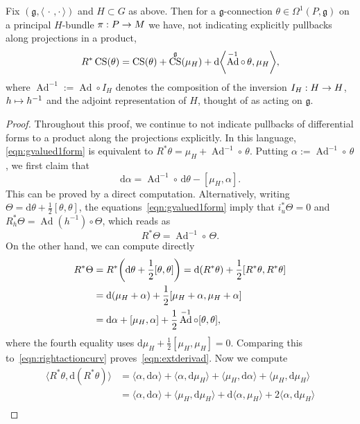 \documentclass[AHL,Unicode,longabstracts]{cedram}
\newcommand{\B}[2]{\langle#1,#2\rangle}
\DeclareMathOperator{\CS}{CS}
\DeclareMathOperator{\Ad}{Ad}
\renewcommand*{\d}{\mathrm{d}}
\newcommand{\fkg}{\mathfrak{g}}
\renewcommand*{\to}{\mathchoice{\longrightarrow}{\rightarrow}{\rightarrow}{\rightarrow}}
\let\oldmapsto\mapsto
\renewcommand*{\mapsto}{\mathchoice{\longmapsto}{\oldmapsto}{\oldmapsto}{\oldmapsto}}
\let\originalleft\left
\let\originalright\right
\renewcommand{\left}{\mathopen{}\mathclose\bgroup\originalleft}
\renewcommand{\right}{\aftergroup\egroup\originalright}
\begin{document}
\begin{lemm}\label{lemm3.4}
Fix $(\fkg,\B{\,\cdot\,}{\cdot\,})$ and $H\subset G$ as above.
Then for a $\fkg$-connection $\theta \in \Omega^1(P,\fkg)$ on a principal $H$-bundle $\pi : P \to M$ we have, not indicating explicitly pullbacks along projections in a product,
\begin{equation}\label{eqn:keyid}
R^*\CS(\theta)=\CS(\theta)+\CS^\fkg(\mu_H)+\d\left\langle\Ad^{-1}\circ\,\theta,\mu_H\right\rangle,
\end{equation}
where $\Ad^{-1}:=\Ad\circ I_H$ denotes the composition of the inversion $I_H : H \to H$, $h \mapsto h^{-1}$ and the adjoint representation of $H$, thought of as acting on $\fkg$.
\end{lemm}


\begin{proof}
Throughout this proof, we continue to not indicate pullbacks of differential forms to a product along the projections explicitly. In this language, \eqref{eqn:gvalued1form} is equivalent to $R^*\theta=\mu_H+\Ad^{-1}\circ\,\theta$. Putting $\alpha:=\Ad^{-1}\circ\,\theta$, we first claim that
\begin{equation}\label{eqn:extderivad}
\d\alpha=\Ad^{-1}\circ\,\d\theta-[\mu_H,\alpha].
\end{equation}
This can be proved by a direct computation. Alternatively, writing $\Theta=\d\theta+\frac{1}{2}[\theta,\theta]$, the equations~\eqref{eqn:gvalued1form} imply that $i_u^*\Theta=0$ and $R_h^*\Theta=\Ad(h^{-1})\circ\Theta$, which reads as
\begin{equation}\label{eqn:rightactioncurv}
R^*\Theta=\Ad^{-1}\circ\,\Theta.
\end{equation}
On the other hand, we can compute directly
\begin{align*}
R^*\Theta&=R^*\left(\d\theta+\frac{1}{2}[\theta,\theta]\right)=\d(R^*\theta)+\frac{1}{2}[R^*\theta,R^*\theta]\\
&=\d(\mu_H+\alpha)+\frac{1}{2}[\mu_H+\alpha,\mu_H+\alpha]\\
&=\d\alpha+[\mu_H,\alpha]+\frac{1}{2}\Ad^{-1}\circ [\theta,\theta],
\end{align*}
where the fourth equality uses $\d\mu_H+\frac{1}{2}[\mu_H,\mu_H]=0$. Comparing this to~\eqref{eqn:rightactioncurv} proves~\eqref{eqn:extderivad}. Now we compute
\begin{align*}
\B{R^*\theta}{\d(R^*\theta)}&=\B{\alpha}{\d\alpha}+\B{\alpha}{\d\mu_H}+\B{\mu_H}{\d \alpha}+\B{\mu_H}{\d \mu_H}\\
&=\B{\alpha}{\d\alpha}+\B{\mu_H}{\d \mu_H}+\d\B{\alpha}{\mu_H}+2\B{\alpha}{\d\mu_H}\\

\end{align*}
\end{proof}
\end{document}
